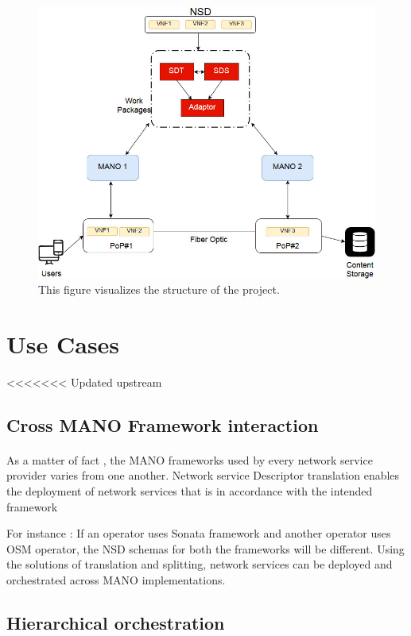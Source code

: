 \begin{figure}
	\centering
	\includegraphics[width=0.7\linewidth]{figures/Structure_Updated1}
	\caption{This figure visualizes the structure of the project. }
	\label{fig:structureupdated1}
\end{figure}


\newpage
\section{Use Cases}

<<<<<<< Updated upstream
 
\subsection{Cross MANO Framework interaction}
\paragraph{}

As a matter of fact , the MANO frameworks used by every network service provider varies from one another. 
Network service Descriptor translation enables the deployment of network services that is in accordance with the intended framework

For instance : If an operator uses Sonata framework and another operator uses OSM operator, the NSD schemas for both the frameworks will be different. Using the solutions of translation and splitting, network services can be deployed and orchestrated across MANO implementations.

\subsection{Hierarchical orchestration}
